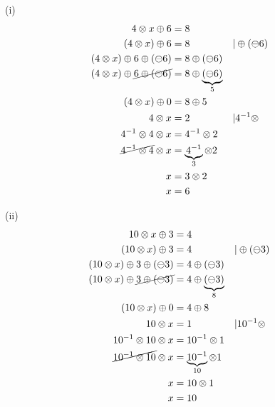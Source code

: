 (i)
\begin{align*}
4 \otimes x \oplus 6 &= 8\\
(4 \otimes x) \oplus 6 &= 8 &&| \oplus (\ominus 6)\\
(4 \otimes x) \oplus 6 \oplus (\ominus 6) &= 8 \oplus (\ominus 6)\\
(4 \otimes x) \oplus \cancel{6 \oplus (\ominus 6)} &= 8 \oplus \underbrace{(\ominus 6)}_{5}\\
(4 \otimes x) \oplus 0 &= 8 \oplus 5\\
4 \otimes x &= 2 &&| 4^{-1} \otimes \\
4^{-1} \otimes 4 \otimes x &= 4^{-1} \otimes 2\\
\cancel{4^{-1} \otimes 4} \otimes x &= \underbrace{4^{-1}}_{3} \otimes 2\\
x &= 3 \otimes 2\\
x &= 6
\end{align*}

(ii)
\begin{align*}
10 \otimes x \oplus 3 &= 4\\
(10 \otimes x) \oplus 3 &= 4 &&| \oplus (\ominus 3)\\
(10 \otimes x) \oplus 3 \oplus (\ominus 3) &= 4 \oplus (\ominus 3)\\
(10 \otimes x) \oplus \cancel{3 \oplus (\ominus 3)} &= 4 \oplus \underbrace{(\ominus 3)}_{8}\\
(10 \otimes x) \oplus 0 &= 4 \oplus 8\\
10 \otimes x &= 1 &&| 10^{-1} \otimes\\
10^{-1} \otimes 10 \otimes x &= 10^{-1} \otimes 1\\
\cancel{10^{-1} \otimes 10} \otimes x &= \underbrace{10^{-1}}_{10} \otimes 1\\
x &= 10 \otimes 1\\
x &= 10
\end{align*}
\newpage

